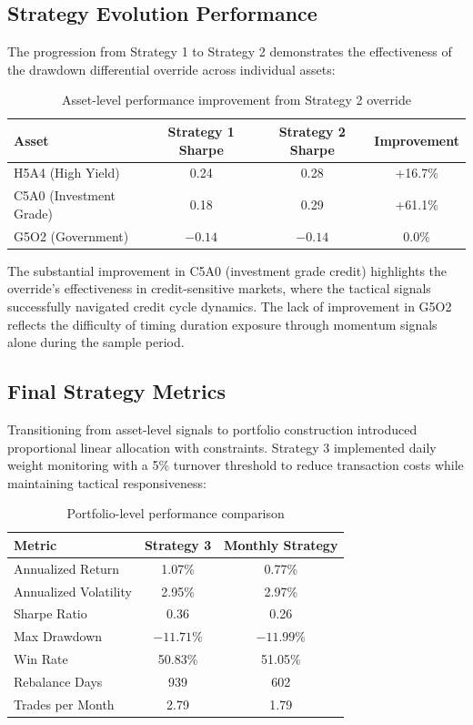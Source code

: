 \documentclass[11pt, letterpaper]{article}
\begin{document}
\subsection{Strategy Evolution Performance}

The progression from Strategy 1 to Strategy 2 demonstrates the effectiveness of the drawdown differential override across individual assets:

\begin{table}[H]
\centering
\begin{tabular}{lccc}
\toprule
Asset & Strategy 1 Sharpe & Strategy 2 Sharpe & Improvement \\
\midrule
H5A4 (High Yield) & 0.24 & 0.28 & +16.7\% \\
C5A0 (Investment Grade) & 0.18 & 0.29 & +61.1\% \\
G5O2 (Government) & $-0.14$ & $-0.14$ & 0.0\% \\
\bottomrule
\end{tabular}
\caption{Asset-level performance improvement from Strategy 2 override}
\end{table}

The substantial improvement in C5A0 (investment grade credit) highlights the override's effectiveness in credit-sensitive markets, where the tactical signals successfully navigated credit cycle dynamics. The lack of improvement in G5O2 reflects the difficulty of timing duration exposure through momentum signals alone during the sample period.

\subsection{Final Strategy Metrics}

Transitioning from asset-level signals to portfolio construction introduced proportional linear allocation with constraints. Strategy 3 implemented daily weight monitoring with a 5\% turnover threshold to reduce transaction costs while maintaining tactical responsiveness:

\begin{table}[H]
\centering
\begin{tabular}{lcc}
\toprule
Metric & Strategy 3 & Monthly Strategy \\
\midrule
Annualized Return & 1.07\% & 0.77\% \\
Annualized Volatility & 2.95\% & 2.97\% \\
Sharpe Ratio & 0.36 & 0.26 \\
Max Drawdown & $-11.71\%$ & $-11.99\%$ \\
Win Rate & 50.83\% & 51.05\% \\
Rebalance Days & 939 & 602 \\
Trades per Month & 2.79 & 1.79 \\
\bottomrule
\end{tabular}
\caption{Portfolio-level performance comparison}
\end{table}
\end{document}
